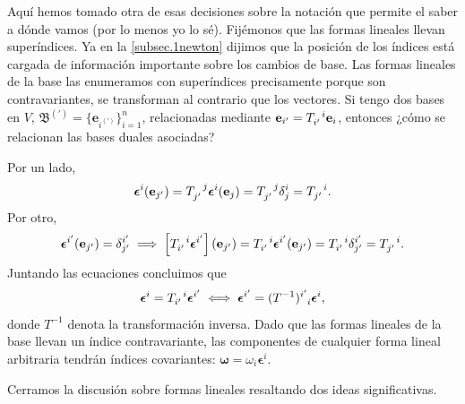 Aquí hemos tomado otra de esas decisiones sobre la notación que permite el saber a dónde vamos (por lo menos yo lo sé). Fijémonos que las formas lineales llevan superíndices. Ya en la \cref{subsec.1newton} dijimos que la posición de los índices está cargada de información importante sobre los cambios de base. Las formas lineales de la base las enumeramos con superíndices precisamente porque son contravariantes, se transforman al contrario que los vectores. Si tengo dos bases en \(V\), \(\mathfrak{B}^{(\prime)} = \{\mathbf{e}_{i^{(\prime)}}\}_{i=1}^n\), relacionadas mediante \(\mathbf{e}_{i'} = \tensor{T}{_{i'}^i}\mathbf{e}_i\), entonces ¿cómo se relacionan las bases duales asociadas? 

Por un lado,
\begin{equation*}
    \boldsymbol{\epsilon}^i(\mathbf{e}_{j'}) = \tensor{T}{_{j'}^j}\boldsymbol{\epsilon}^i(\mathbf{e}_{j}) = \tensor{T}{_{j'}^j}\delta^{i}_{j} = \tensor{T}{_{j'}^i}.
\end{equation*}
Por otro, 
\begin{equation*}
    \boldsymbol{\epsilon}^{i'}(\mathbf{e}_{j'}) = \delta^{i'}_{j'} \implies  \left[\tensor{T}{_{i'}^i} \boldsymbol{\epsilon}^{i'}\right](\mathbf{e}_{j'}) = \tensor{T}{_{i'}^i} \boldsymbol{\epsilon}^{i'}(\mathbf{e}_{j'}) = \tensor{T}{_{i'}^i} \delta_{j'}^{i'} = \tensor{T}{_{j'}^i}.
\end{equation*}
Juntando las ecuaciones concluimos que 
\begin{equation}
    \boldsymbol{\epsilon}^{i} = \tensor{T}{_{i'}^i}\boldsymbol{\epsilon}^{i'} \iff \boldsymbol{\epsilon}^{i'} = \tensor{(T^{-1})}{^{i'}_i}\boldsymbol{\epsilon}^i,
\end{equation}
donde \(T^{-1}\) denota la transformación inversa. Dado que las formas lineales de la base llevan un índice contravariante, las componentes de cualquier forma lineal arbitraria tendrán índices covariantes: \(\boldsymbol{\omega} = \omega_i \boldsymbol{\epsilon}^i\).

Cerramos la discusión sobre formas lineales resaltando dos ideas significativas. 

